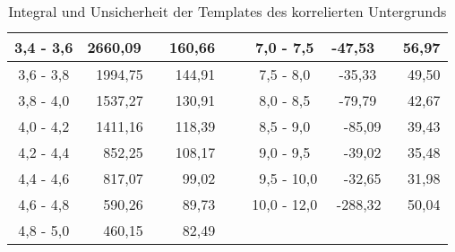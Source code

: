 \begin{table}[]
\begin{tabular}{ | c || r | r ||  l  || c || r | r | }
		3,4 - 3,6 & 2660,09 \ & 160,66 \hspace{3mm} & \ &  7,0 - 7,5 & -47,53 \ & 56,97 \hspace{3mm} \\ \hline
		3,6 - 3,8 & 1994,75 \ & 144,91 \hspace{3mm} & \ &  7,5 - 8,0 & -35,33 \ & 49,50 \hspace{3mm} \\ \hline
		3,8 - 4,0 & 1537,27 \ & 130,91 \hspace{3mm} & \ &  8,0 - 8,5 & -79,79 \ & 42,67 \hspace{3mm} \\ \hline
		4,0 - 4,2 & 1411,16 \ & 118,39 \hspace{3mm} & \ &  8,5 - 9,0 & -85,09 \, & 39,43 \hspace{3mm} \\ \hline
		4,2 - 4,4 & 852,25 \  & 108,17 \hspace{3mm} & \ &  9,0 - 9,5 & -39,02 \, & 35,48 \hspace{3mm} \\ \hline
		4,4 - 4,6 & 817,07 \  & 99,02 \hspace{3mm} &  \ &  \, 9,5 - 10,0 & -32,65 \, & 31,98 \hspace{3mm} \\ \hline
		4,6 - 4,8 & 590,26 \  & 89,73 \hspace{3mm} &  \ &  10,0 - 12,0 & -288,32 \,& 50,04 \hspace{3mm} \\ \hline
		4,8 - 5,0 & 460,15 \  & 82,49 \hspace{3mm} &  \ & \   & \  & \  \\ \hline
	
	\end{tabular}
	
	\caption{Integral und Unsicherheit der Templates des korrelierten Untergrunds}
	\label{tab:IntAndError}
	
\end{table}